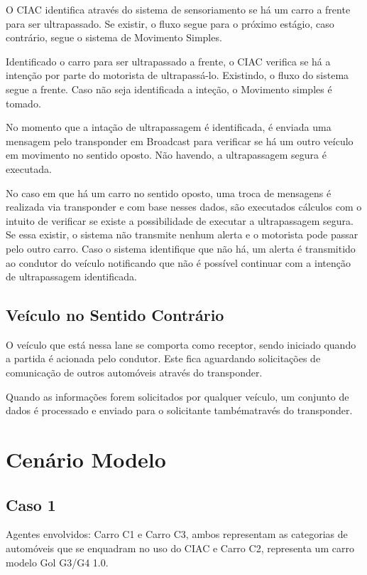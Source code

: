 O CIAC identifica através do sistema de sensoriamento se há um carro a frente
para ser ultrapassado. Se existir, o fluxo segue para o próximo estágio, caso
contrário, segue o sistema de Movimento Simples.

Identificado o carro para ser ultrapassado a frente, o CIAC verifica se há a
intenção por parte do motorista de ultrapassá-lo. Existindo, o fluxo do sistema
segue a frente. Caso não seja identificada a inteção, o Movimento simples
é tomado.

No momento que a intação de ultrapassagem é identificada, é enviada uma mensagem
pelo transponder em Broadcast para verificar se há um outro veículo em movimento
no sentido oposto. Não havendo, a ultrapassagem segura é executada.

No caso em que há um carro no sentido oposto, uma troca de mensagens é realizada
via transponder e com base nesses dados, são executados cálculos com o intuito
de verificar se existe a possibilidade de executar a ultrapassagem segura.
Se essa existir, o sistema não transmite nenhum alerta e o motorista pode passar
pelo outro carro. Caso o sistema identifique que não há, um alerta é transmitido
ao condutor do veículo notificando que não é possível continuar com a intenção
de ultrapassagem identificada.

\subsection{Veículo no Sentido Contrário}

O veículo que está nessa lane se comporta como receptor, sendo iniciado quando
a partida é acionada pelo condutor. Este fica aguardando solicitações de
comunicação de outros automóveis através do transponder.

Quando as informações forem
solicitados por qualquer veículo, um conjunto de dados é processado e enviado
para o solicitante tambématravés do transponder.

\section{Cenário Modelo}

\subsection{Caso 1}

Agentes envolvidos: Carro C1 e Carro C3, ambos representam as categorias de
automóveis que se enquadram no uso do CIAC e Carro C2, representa um carro
modelo Gol G3/G4 1.0.

